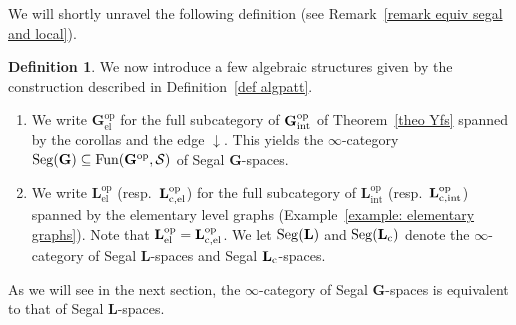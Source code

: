 \documentclass{amsart}
\numberwithin{theorem}{subsection}
\theoremstyle{definition}
\newtheorem{definition}[theorem]{Definition}
\providecommand{\op}{\mathrm{op}}
\providecommand{\xel}{\mathrm{el}}
\providecommand{\xint}{\mathrm{int}}
\newcommand{\xFun}{\operatorname{Fun}}
\newcommand{\xS}{\mathcal{S}}
\newcommand{\name}[1]{\ensuremath{\text{\textup{#1}}}}
\newcommand{\levelg}{\mathbf{L}}
\newcommand{\levelgconn}{\levelg_{\name{c}}}
\newcommand{\bbY}{\mathbf{G}}
\newcommand{\hryint}{\bbY_{\name{int}}}
\newcommand{\Seg}{\name{Seg}}
\begin{document}
We will shortly unravel the following definition (see Remark~\ref{remark equiv segal and local}).

\begin{definition}
\label{def segal upsilon and ell}
	We now introduce a few algebraic structures given by the construction described in Definition~\ref{def algpatt}.
	\begin{enumerate}
		\item 
		We write $\bbY^{\op}_{\xel}$ for the full subcategory of $\hryint^{\op}$ of Theorem~\ref{theo Yfs} spanned by the corollas and the edge $\downarrow$.
		This yields 
		the $\infty$-category $\Seg(\bbY) \subseteq \xFun(\bbY^\op, \xS)$ of Segal $\bbY$-spaces.
		\item We write $\levelg^{\op}_{\xel}$ (resp.\ $\levelg^{\op}_{\name{c},\xel}$) for the full subcategory of $\levelg^{\op}_{\xint}$ (resp.\ $\levelg^{\op}_{\name{c},\xint}$) spanned by the elementary level graphs (Example~\ref{example: elementary graphs}).
		Note that $\levelg^{\op}_{\xel} = \levelg^{\op}_{\name{c},\xel}$.
		We let $\Seg(\levelg)$ and $\Seg(\levelgconn)$ denote the $\infty$-category of Segal $\levelg$-spaces and Segal $\levelgconn$-spaces.
	\end{enumerate}
\end{definition}

As we will see in the next section, the $\infty$-category of Segal $\bbY$-spaces is equivalent to that of Segal $\levelg$-spaces.
\end{document}
